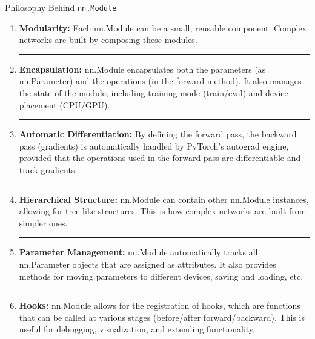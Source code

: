 \documentclass[aspectratio=169,xcolor=dvipsnames,svgnames,x11names,fleqn]{beamer}
\begin{document}
\begin{frame}{Philosophy Behind \texttt{nn.Module}}

    \footnotesize

    \begin{enumerate}
        \item \textbf{Modularity:} Each nn.Module can be a small, reusable component. Complex networks are built by composing these modules. \vspace{2pt} \hrule
        \item {\color{MediumRed}\textbf{Encapsulation:} nn.Module encapsulates both the parameters (as nn.Parameter) and the operations (in the forward method). It also manages the state of the module, including training mode (train/eval) and device placement (CPU/GPU). \vspace{2pt} \hrule }
        \item \textbf{Automatic Differentiation:} By defining the forward pass, the backward pass (gradients) is automatically handled by PyTorch's autograd engine, provided that the operations used in the forward pass are differentiable and track gradients. \vspace{2pt} \hrule

        \item {\color{MediumRed}\textbf{Hierarchical Structure:} nn.Module can contain other nn.Module instances, allowing for tree-like structures. This is how complex networks are built from simpler ones.\vspace{2pt} \hrule}

        \item \textbf{Parameter Management:} nn.Module automatically tracks all nn.Parameter objects that are assigned as attributes. It also provides methods for moving parameters to different devices, saving and loading, etc.\vspace{2pt} \hrule

        \item {\color{MediumRed}\textbf{Hooks:} nn.Module allows for the registration of hooks, which are functions that can be called at various stages (before/after forward/backward). This is useful for debugging, visualization, and extending functionality.}
    \end{enumerate}
    
\end{frame}
\end{document}
